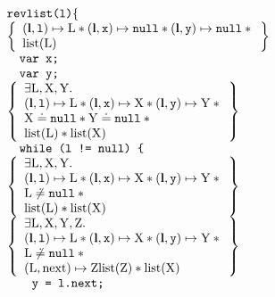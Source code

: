 \documentclass{article}
\begin{document}
{\begin{figure}
{\scriptsize
\[
\begin{array}{l}
        \js{revlist(l)}\{\\
        \left\{\begin{array}{l}
                (\ls,\js{l})\pointsto\V{L}\sep(\ls,\js{x})\pointsto\nil \sep (\ls,\js{y})\pointsto\nil\sep{}\\
                \text{list}(\V{L})
        \end{array}\right\}\\
        \quad \js{var x;}\\
        \quad \js{var y;}\\
        \left\{\begin{array}{l}
                \exists \V{L},\V{X},\V{Y}\st\\
                (\ls,\js{l})\pointsto\V{L}\sep(\ls,\js{x})\pointsto\V{X} \sep (\ls,\js{y})\pointsto\V{Y}\sep{}\\
                \V{X}\doteq\nil\sep\V{Y}\doteq\nil\sep{}\\
                \text{list}(\V{L}) \sep \text{list}(\V{X})
        \end{array}\right\}\\
        \quad \js{while (l != \nil) \{}\\
        \left\{\begin{array}{l}
                \exists \V{L},\V{X},\V{Y}\st\\
                (\ls,\js{l})\pointsto\V{L}\sep(\ls,\js{x})\pointsto\V{X} \sep (\ls,\js{y})\pointsto\V{Y}\sep{}\\
                \V{L}\not\doteq\nil\sep{}\\
                \text{list}(\V{L}) \sep \text{list}(\V{X})
        \end{array}\right\}\\
        \left\{\begin{array}{l}
                \exists \V{L},\V{X},\V{Y},\V{Z}\st\\
                (\ls,\js{l})\pointsto\V{L}\sep(\ls,\js{x})\pointsto\V{X} \sep (\ls,\js{y})\pointsto\V{Y}\sep{}\\
                \V{L}\not\doteq\nil\sep{}\\
                (\V{L},\text{next})\pointsto\V{Z}\text{list}(\V{Z}) \sep \text{list}(\V{X})
        \end{array}\right\}\\
        \qquad \js{y = l.next;}\\

\end{array}\]}
\end{figure}}
\end{document}
